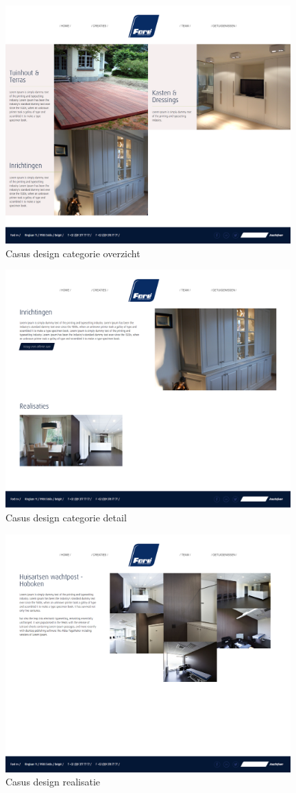 \begin{figure}[!ht]
  \includegraphics[width=110mm]{img/design-05.png}
  \centering
  \caption{Casus design categorie overzicht}
  \label{fig:Casus design categorie overzicht}
\end{figure}

\begin{figure}[!ht]
  \includegraphics[width=110mm]{img/design-06.png}
  \centering
  \caption{Casus design categorie detail}
  \label{fig:Casus design categorie detail}
\end{figure}

\begin{figure}[!ht]
  \includegraphics[width=110mm]{img/design-07.png}
  \centering
  \caption{Casus design realisatie}
  \label{fig:Casus design realisatie}
\end{figure}